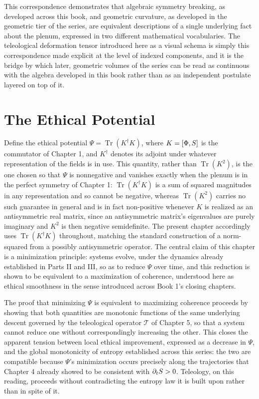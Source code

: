 This correspondence demonstrates that algebraic symmetry breaking, as developed across this book, and geometric curvature, as developed in the geometric tier of the series, are equivalent descriptions of a single underlying fact about the plenum, expressed in two different mathematical vocabularies. The teleological deformation tensor introduced here as a visual schema is simply this correspondence made explicit at the level of indexed components, and it is the bridge by which later, geometric volumes of the series can be read as continuous with the algebra developed in this book rather than as an independent postulate layered on top of it.

\chapter{The Ethical Potential}

Define the ethical potential $\Psi = \operatorname{Tr}(K^{\dagger} K)$, where $K = [\Phi, S]$ is the commutator of Chapter 1, and $K^{\dagger}$ denotes its adjoint under whatever representation of the fields is in use. This quantity, rather than $\operatorname{Tr}(K^2)$, is the one chosen so that $\Psi$ is nonnegative and vanishes exactly when the plenum is in the perfect symmetry of Chapter 1: $\operatorname{Tr}(K^{\dagger}K)$ is a sum of squared magnitudes in any representation and so cannot be negative, whereas $\operatorname{Tr}(K^2)$ carries no such guarantee in general and is in fact non-positive whenever $K$ is realized as an antisymmetric real matrix, since an antisymmetric matrix's eigenvalues are purely imaginary and $K^2$ is then negative semidefinite. The present chapter accordingly uses $\operatorname{Tr}(K^\dagger K)$ throughout, matching the standard construction of a norm-squared from a possibly antisymmetric operator. The central claim of this chapter is a minimization principle: systems evolve, under the dynamics already established in Parts II and III, so as to reduce $\Psi$ over time, and this reduction is shown to be equivalent to a maximization of coherence, understood here as ethical smoothness in the sense introduced across Book 1's closing chapters.

The proof that minimizing $\Psi$ is equivalent to maximizing coherence proceeds by showing that both quantities are monotonic functions of the same underlying descent governed by the teleological operator $\mathcal{T}$ of Chapter 5, so that a system cannot reduce one without correspondingly increasing the other. This closes the apparent tension between local ethical improvement, expressed as a decrease in $\Psi$, and the global monotonicity of entropy established across this series: the two are compatible because $\Psi$'s minimization occurs precisely along the trajectories that Chapter 4 already showed to be consistent with $\partial_t S > 0$. Teleology, on this reading, proceeds without contradicting the entropy law it is built upon rather than in spite of it.

